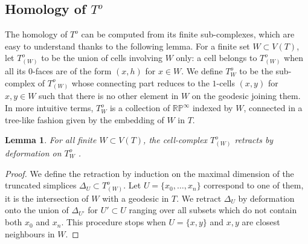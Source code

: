 \documentclass{amsart}
\newtheorem{lemma}{Lemma}
\newcommand{\R}{\mathbb{R}}
\renewcommand{\P}{\mathbb{P}}
\begin{document}
\subsection{Homology of $T^o$}

The homology of $T^o$ can be computed from its finite sub-complexes, which are easy to understand thanks to the following lemma. For a finite set $W\subset V(T)$, let $T^o_{(W)}$ to be the union of cells involving $W$ only: a cell belongs to $T^o_{(W)}$ when all its $0$-faces are of the form $(x,h)$ for $x\in W$. 
%
We define $T^o_W$ to be the sub-complex of $T^o_{(W)}$ whose connecting part reduces to the $1$-cells $(x,y)$ for $x,y \in W$ such that there is no other element in $W$ on the geodesic joining them. In more intuitive terms, $T^o_W$ is a collection of $\R\P^\infty$ indexed by $W$, connected in a tree-like fashion given by the embedding of $W$ in $T$. 

\begin{lemma}\label{retraction}
For all finite $W\subset V(T)$, the cell-complex $T^o_{(W)}$ retracts by deformation on $T^o_W$ .
\end{lemma}

\begin{proof}
We define the retraction by induction on the maximal dimension of the truncated simplices $\Delta_U\subset T^o_{(W)}$. %
Let $U =\{x_0,\dots,x_n\}$ correspond to one of them, it is the intersection of $W$ with a geodesic in $T$. We retract $\Delta_U$ by deformation onto the union of $\Delta_{U'}$ for $U'\subset U$ ranging over all subsets which do not contain both $x_0$ and $x_n$. %
This procedure stops when $U=\{x,y\}$ and $x,y$ are closest neighbours in $W$.
\end{proof}



\end{document}

